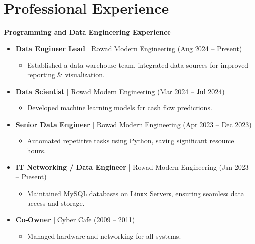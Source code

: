 \documentclass[10pt, letterpaper]{article}
\begin{document}
\section{Professional Experience}
\textbf{\textcolor{primaryColor}{Programming and Data Engineering Experience}}
\begin{itemize}[leftmargin=*]
    \item \textbf{Data Engineer Lead} | Rowad Modern Engineering (Aug 2024 -- Present)
    \begin{itemize}[leftmargin=1cm]
        \item Established a data warehouse team, integrated data sources for improved reporting \& visualization.
    \end{itemize}
    \item \textbf{Data Scientist} | Rowad Modern Engineering (Mar 2024 – Jul 2024)
    \begin{itemize}[leftmargin=1cm]
        \item Developed machine learning models for cash flow predictions.
    \end{itemize}
    \item \textbf{Senior Data Engineer} | Rowad Modern Engineering (Apr 2023 – Dec 2023)
    \begin{itemize}[leftmargin=1cm]
        \item Automated repetitive tasks using Python, saving significant resource hours.
    \end{itemize}
    \item \textbf{IT Networking / Data Engineer} | Rowad Modern Engineering (Jan 2023 – Present)
    \begin{itemize}[leftmargin=1cm]
        \item Maintained MySQL databases on Linux Servers, ensuring seamless data access and storage.
    \end{itemize}
    \item \textbf{Co-Owner} | Cyber Cafe (2009 – 2011)
    \begin{itemize}[leftmargin=1cm]
        \item Managed hardware and networking for all systems.
    \end{itemize}
\end{itemize}
\end{document}
